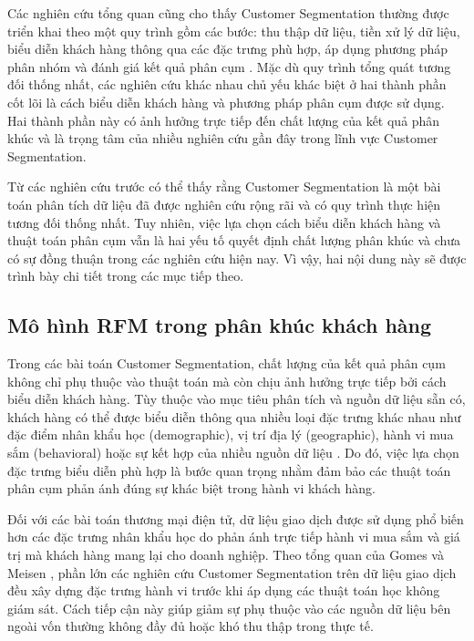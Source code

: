 \documentclass[12pt]{ai_conquer2026}
\begin{document}
Các nghiên cứu tổng quan cũng cho thấy Customer Segmentation thường được triển khai theo một quy trình gồm các bước: thu thập dữ liệu, tiền xử lý dữ liệu, biểu diễn khách hàng thông qua các đặc trưng phù hợp, áp dụng phương pháp phân nhóm và đánh giá kết quả phân cụm \cite{Sari2016,Gomes2023}. Mặc dù quy trình tổng quát tương đối thống nhất, các nghiên cứu khác nhau chủ yếu khác biệt ở hai thành phần cốt lõi là cách biểu diễn khách hàng và phương pháp phân cụm được sử dụng. Hai thành phần này có ảnh hưởng trực tiếp đến chất lượng của kết quả phân khúc và là trọng tâm của nhiều nghiên cứu gần đây trong lĩnh vực Customer Segmentation.

Từ các nghiên cứu trước có thể thấy rằng Customer Segmentation là một bài toán phân tích dữ liệu đã được nghiên cứu rộng rãi và có quy trình thực hiện tương đối thống nhất. Tuy nhiên, việc lựa chọn cách biểu diễn khách hàng và thuật toán phân cụm vẫn là hai yếu tố quyết định chất lượng phân khúc và chưa có sự đồng thuận trong các nghiên cứu hiện nay. Vì vậy, hai nội dung này sẽ được trình bày chi tiết trong các mục tiếp theo.

\subsection{Mô hình RFM trong phân khúc khách hàng}

Trong các bài toán Customer Segmentation, chất lượng của kết quả phân cụm không chỉ phụ thuộc vào thuật toán mà còn chịu ảnh hưởng trực tiếp bởi cách biểu diễn khách hàng. Tùy thuộc vào mục tiêu phân tích và nguồn dữ liệu sẵn có, khách hàng có thể được biểu diễn thông qua nhiều loại đặc trưng khác nhau như đặc điểm nhân khẩu học (demographic), vị trí địa lý (geographic), hành vi mua sắm (behavioral) hoặc sự kết hợp của nhiều nguồn dữ liệu \cite{Wedel2000,Gomes2023}. Do đó, việc lựa chọn đặc trưng biểu diễn phù hợp là bước quan trọng nhằm đảm bảo các thuật toán phân cụm phản ánh đúng sự khác biệt trong hành vi khách hàng.

Đối với các bài toán thương mại điện tử, dữ liệu giao dịch được sử dụng phổ biến hơn các đặc trưng nhân khẩu học do phản ánh trực tiếp hành vi mua sắm và giá trị mà khách hàng mang lại cho doanh nghiệp. Theo tổng quan của Gomes và Meisen \cite{Gomes2023}, phần lớn các nghiên cứu Customer Segmentation trên dữ liệu giao dịch đều xây dựng đặc trưng hành vi trước khi áp dụng các thuật toán học không giám sát. Cách tiếp cận này giúp giảm sự phụ thuộc vào các nguồn dữ liệu bên ngoài vốn thường không đầy đủ hoặc khó thu thập trong thực tế.
\end{document}

